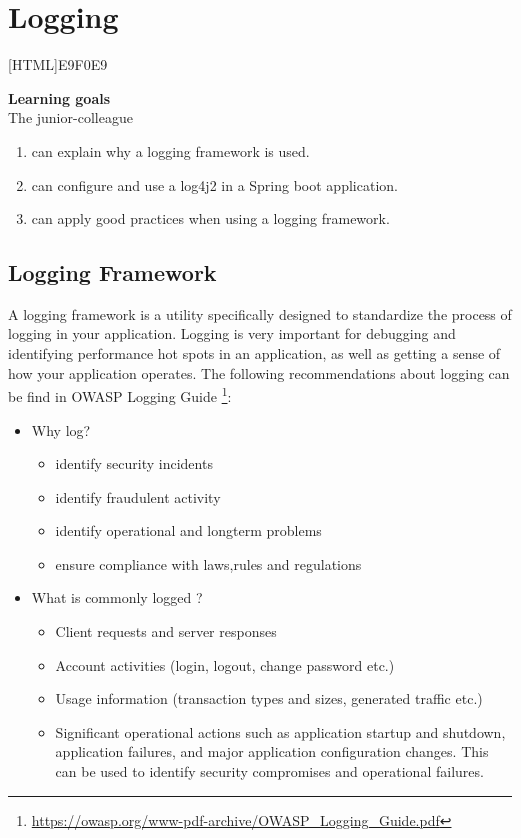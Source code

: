 \chapter{Logging}
\label{chap:logging}

[HTML]{E9F0E9}{\parbox{\textwidth}{%
\noindent \textbf{Learning goals}\\
The junior-colleague
\begin{enumerate}[nolistsep]
\item can explain why a logging framework is used.
\item can configure and use a log4j2 in a Spring boot application.
\item can apply good practices when using a logging framework.
\end{enumerate}}}

\section{Logging Framework}

A logging framework is a utility specifically designed to standardize the process of logging in your application.  Logging is very important for debugging and identifying performance hot spots in an application, as well as getting a sense of how your application operates.  The following recommendations about logging can be find in OWASP Logging Guide \footnote{\url{https://owasp.org/www-pdf-archive/OWASP_Logging_Guide.pdf}}:

\begin{itemize}
\item Why log?
\begin{itemize}
\item identify security incidents
\item identify fraudulent activity
\item identify operational and longterm problems
\item ensure compliance with laws,rules and regulations
\end{itemize}
\item What is commonly logged ?
\begin{itemize}
\item Client requests and server responses
\item Account activities (login, logout, change password etc.)
\item Usage information (transaction types and sizes, generated traffic etc.)
\item Significant operational actions such as application startup and shutdown, application failures, and major application configuration changes. This can be used to identify security compromises and operational failures.
\end{itemize}
\end{itemize}

